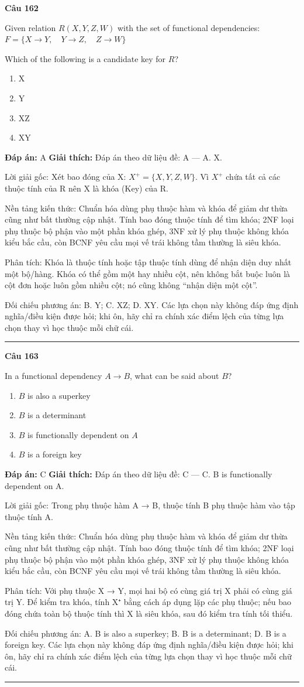 \documentclass[11pt,a4paper]{article}
\newenvironment{question}[1]{%
  \par\vspace{1em}\noindent\textbf{\large Câu #1}\par\vspace{0.4em}
}{%
  \par\vspace{1em}\hrule\vspace{0.6em}
}
\newenvironment{choices}{%
  \begin{enumerate}[label=\textbf{\Alph*.},leftmargin=2.2em,itemsep=2pt,topsep=3pt]
}{%
  \end{enumerate}
}
\newcommand{\choice}{\item}
\begin{document}
\begin{question}{162}
Given relation \(R(X, Y, Z, W)\) with the set of functional dependencies:
\(F = \{ X \rightarrow Y, \quad Y \rightarrow Z, \quad Z \rightarrow W \}\)

Which of the following is a candidate key for \(R\)?
\begin{choices}
\choice X
\choice Y
\choice XZ
\choice XY
\end{choices}
\textbf{Đáp án:} A
\textbf{Giải thích:} Đáp án theo dữ liệu đề: A — A. X.

Lời giải gốc: Xét bao đóng của X: $X^+ = \{X, Y, Z, W\}$. Vì $X^+$ chứa tất cả các thuộc tính của R nên X là khóa (Key) của R.

Nền tảng kiến thức: Chuẩn hóa dùng phụ thuộc hàm và khóa để giảm dư thừa cũng như bất thường cập nhật. Tính bao đóng thuộc tính để tìm khóa; 2NF loại phụ thuộc bộ phận vào một phần khóa ghép, 3NF xử lý phụ thuộc không khóa kiểu bắc cầu, còn BCNF yêu cầu mọi vế trái không tầm thường là siêu khóa.

Phân tích: Khóa là thuộc tính hoặc tập thuộc tính dùng để nhận diện duy nhất một bộ/hàng. Khóa có thể gồm một hay nhiều cột, nên không bắt buộc luôn là cột đơn hoặc luôn gồm nhiều cột; nó cũng không “nhận diện một cột”.

Đối chiếu phương án: B. Y; C. XZ; D. XY. Các lựa chọn này không đáp ứng định nghĩa/điều kiện được hỏi; khi ôn, hãy chỉ ra chính xác điểm lệch của từng lựa chọn thay vì học thuộc mỗi chữ cái.
\end{question}

\begin{question}{163}
In a functional dependency \(A \rightarrow B\), what can be said about \(B\)?
\begin{choices}
\choice \(B\) is also a superkey
\choice \(B\) is a determinant
\choice \(B\) is functionally dependent on \(A\)
\choice \(B\) is a foreign key
\end{choices}
\textbf{Đáp án:} C
\textbf{Giải thích:} Đáp án theo dữ liệu đề: C — C. B is functionally dependent on A.

Lời giải gốc: Trong phụ thuộc hàm A → B, thuộc tính B phụ thuộc hàm vào tập thuộc tính A.

Nền tảng kiến thức: Chuẩn hóa dùng phụ thuộc hàm và khóa để giảm dư thừa cũng như bất thường cập nhật. Tính bao đóng thuộc tính để tìm khóa; 2NF loại phụ thuộc bộ phận vào một phần khóa ghép, 3NF xử lý phụ thuộc không khóa kiểu bắc cầu, còn BCNF yêu cầu mọi vế trái không tầm thường là siêu khóa.

Phân tích: Với phụ thuộc X → Y, mọi hai bộ có cùng giá trị X phải có cùng giá trị Y. Để kiểm tra khóa, tính X⁺ bằng cách áp dụng lặp các phụ thuộc; nếu bao đóng chứa toàn bộ thuộc tính thì X là siêu khóa, sau đó kiểm tra tính tối thiểu.

Đối chiếu phương án: A. B is also a superkey; B. B is a determinant; D. B is a foreign key. Các lựa chọn này không đáp ứng định nghĩa/điều kiện được hỏi; khi ôn, hãy chỉ ra chính xác điểm lệch của từng lựa chọn thay vì học thuộc mỗi chữ cái.
\end{question}
\end{document}
